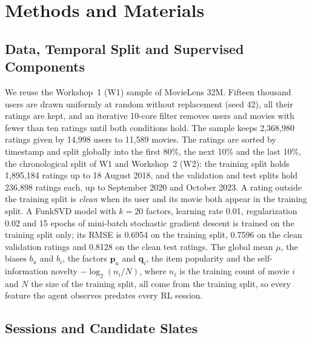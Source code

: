 \section{Methods and Materials}
\label{sec:methods}

\subsection{Data, Temporal Split and Supervised Components}
\label{sec:data}

We reuse the Workshop~1 (W1) sample of MovieLens 32M. Fifteen thousand users are drawn uniformly at random without replacement (seed 42), all their ratings are kept, and an iterative 10-core filter removes users and movies with fewer than ten ratings until both conditions hold. The sample keeps 2{,}368{,}980 ratings given by 14{,}998 users to 11{,}589 movies. The ratings are sorted by timestamp and split globally into the first 80\%, the next 10\% and the last 10\%, the chronological split of W1 and Workshop~2 (W2): the training split holds 1{,}895{,}184 ratings up to 18 August 2018, and the validation and test splits hold 236{,}898 ratings each, up to September 2020 and October 2023. A rating outside the training split is \emph{clean} when its user and its movie both appear in the training split. A FunkSVD model with $k = 20$ factors, learning rate 0.01, regularization 0.02 and 15 epochs of mini-batch stochastic gradient descent is trained on the training split only; its RMSE is 0.6954 on the training split, 0.7596 on the clean validation ratings and 0.8128 on the clean test ratings. The global mean $\mu$, the biases $b_u$ and $b_i$, the factors $\mathbf{p}_u$ and $\mathbf{q}_i$, the item popularity and the self-information novelty $-\log_2(n_i/N)$, where $n_i$ is the training count of movie $i$ and $N$ the size of the training split, all come from the training split, so every feature the agent observes predates every RL session.

\subsection{Sessions and Candidate Slates}
\label{sec:sessions}


